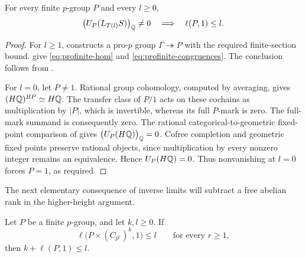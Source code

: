 \begin{corollary}\label{cor:rational-gluing}
For every finite $p$-group $P$ and every $l\geq0$,
\[
 \bigl(U_P(L_{T(l)}S)\bigr)_{\mathbb Q}\ne0
       \quad\Longrightarrow\quad \ell(P,1)\leq l.
\]
\end{corollary}

\begin{proof}
For $l\geq1$,  constructs a pro-$p$ group
$\Gamma\twoheadrightarrow P$ with the required finite-section bound.
 give
\eqref{eq:profinite-hom} and \eqref{eq:profinite-congruences}.
The conclusion follows from .

For $l=0$, let $P\ne1$.  Rational group cohomology, computed by
averaging, gives $(H\mathbb Q)^{BP}\simeq H\mathbb Q$.
The transfer class of $P/1$ acts on these cochains as multiplication
by $|P|$, which is invertible, whereas its full $P$-mark is zero.
The full-mark summand is consequently zero.  The rational
categorical-to-geometric fixed-point comparison of
 gives
$\bigl(U_P(H\mathbb Q)\bigr)_{\mathbb Q}=0$.
Cofree completion and geometric fixed points preserve rational
objects, since multiplication by every nonzero integer remains an
equivalence.  Hence $U_P(H\mathbb Q)=0$.
Thus nonvanishing at $l=0$ forces $P=1$, as required.
\end{proof}

The next elementary consequence of inverse limits will subtract a
free abelian rank in the higher-height argument.

\begin{lemma}\label{lem:product-series}
Let $P$ be a finite $p$-group, and let $k,l\geq0$.
If
\[
 \ell\bigl(P\times(C_{p^r})^k,1\bigr)\leq l
          \qquad\text{for every }r\geq1,
\]
then $k+\ell(P,1)\leq l$.
\end{lemma}

